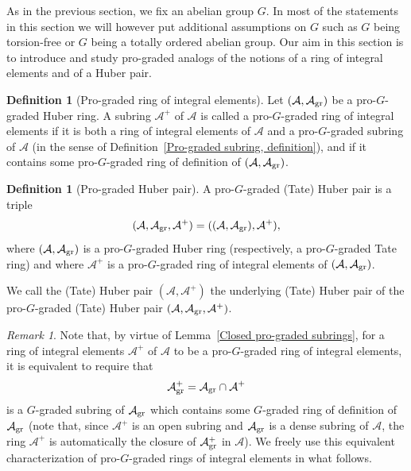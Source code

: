 \documentclass[12pt,twoside,a4paper]{article}
\theoremstyle{definition}
\newtheorem{mydef}[thm]{Definition}
\theoremstyle{remark}
\newtheorem{rmk}[thm]{Remark}
\newcommand\gr{{\rm gr}}
\begin{document}
As in the previous section, we fix an abelian group $G$. In most of the statements in this section we will however put additional assumptions on $G$ such as $G$ being torsion-free or $G$ being a totally ordered abelian group. Our aim in this section is to introduce and study pro-graded analogs of the notions of a ring of integral elements and of a Huber pair.
\begin{mydef}[Pro-graded ring of integral elements]\label{Pro-graded ring of integral elements, definition}Let $(\mathcal{A}, \mathcal{A}_{\gr})$ be a pro-$G$-graded Huber ring. A subring $\mathcal{A}^{+}$ of $\mathcal{A}$ is called a pro-$G$-graded ring of integral elements if it is both a ring of integral elements of $\mathcal{A}$ and a pro-$G$-graded subring of $\mathcal{A}$ (in the sense of Definition~\ref{Pro-graded subring, definition}), and if it contains some pro-$G$-graded ring of definition of $(\mathcal{A}, \mathcal{A}_{\gr})$.\end{mydef} 
\begin{mydef}[Pro-graded Huber pair]\label{Pro-graded Huber pair, definition}A pro-$G$-graded (Tate) Huber pair is a triple \begin{equation*}(\mathcal{A}, \mathcal{A}_{\gr}, \mathcal{A}^{+})=((\mathcal{A}, \mathcal{A}_{\gr}), \mathcal{A}^{+}),\end{equation*}where $(\mathcal{A}, \mathcal{A}_{\gr})$ is a pro-$G$-graded Huber ring (respectively, a pro-$G$-graded Tate ring) and where $\mathcal{A}^{+}$ is a pro-$G$-graded ring of integral elements of $(\mathcal{A}, \mathcal{A}_{\gr})$. 

We call the (Tate) Huber pair $(\mathcal{A}, \mathcal{A}^{+})$ the underlying (Tate) Huber pair of the pro-$G$-graded (Tate) Huber pair $(\mathcal{A}, \mathcal{A}_{\gr}, \mathcal{A}^{+})$. \end{mydef}
\begin{rmk}\label{Two definitions of pro-graded Huber pairs}Note that, by virtue of Lemma~\ref{Closed pro-graded subrings}, for a ring of integral elements $\mathcal{A}^{+}$ of $\mathcal{A}$ to be a pro-$G$-graded ring of integral elements, it is equivalent to require that \begin{equation*}\mathcal{A}_{\gr}^{+}=\mathcal{A}_{\gr}\cap \mathcal{A}^{+}\end{equation*}is a $G$-graded subring of $\mathcal{A}_{\gr}$ which contains some $G$-graded ring of definition of $\mathcal{A}_{\gr}$ (note that, since $\mathcal{A}^{+}$ is an open subring and $\mathcal{A}_{\gr}$ is a dense subring of $\mathcal{A}$, the ring $\mathcal{A}^{+}$ is automatically the closure of $\mathcal{A}_{\gr}^{+}$ in $\mathcal{A}$). We freely use this equivalent characterization of pro-$G$-graded rings of integral elements in what follows.\end{rmk}
\end{document}
